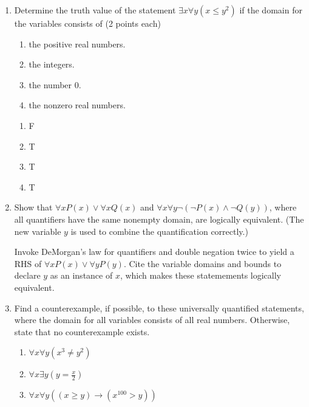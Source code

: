 \begin{enumerate}
    \item{Determine the truth value of the statement $\exists x \forall y (x \leq y^{2})$ if the domain for the variables consists of \hfill \color{blue}(2 points each)}\
    \begin{enumerate}
    \item the positive real numbers.
    \item the integers.
    \item the number 0.
    \item the nonzero real numbers.
    \end{enumerate}
    
    \vspace{2mm}
    \begin{solution}
    \begin{enumerate}
        \item F
        \item T
        \item T
        \item T
    \end{enumerate}
    \end{solution}
    
    \item{Show that $\forall x P(x) \lor \forall x Q(x)$ and $\forall x \forall y \neg(\neg P(x) \land \neg Q(y))$, where all quantifiers have the same nonempty domain, are logically equivalent. (The new variable $y$ is used to combine the quantification correctly.)} 

    \vspace{2mm}
    \begin{solution}
    Invoke DeMorgan's law for quantifiers and double negation twice to yield a RHS of $\forall x P(x) \lor \forall y P(y)$. Cite the variable domains and bounds to declare $y$ as an instance of $x$, which makes these statemements logically equivalent.
    \end{solution}
    
    \item{ Find a counterexample, if possible, to these universally quantified statements, where the domain for all variables consists of all real numbers. Otherwise, state that no counterexample exists. } 
    \begin{enumerate}
        \item $\forall x \forall y (x^3 \neq y^2)$
        \item $\forall x \exists y (y = \frac{x}{2})$
        \item $\forall x \forall y ((x \geq y) \rightarrow (x^{100} > y))$
    \end{enumerate}
    

\end{enumerate}
